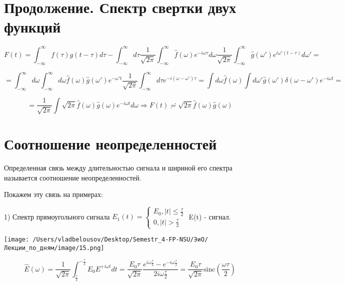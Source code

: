 \documentclass[12pt, a4paper]{report}
\begin{document}
\fi


\section{Продолжение. Спектр свертки двух функций}

\[ F(t)= \int_{-\infty}^{\infty} f(\tau)g(t- \tau)d \tau- \int_{-\infty}^{\infty} d \tau \frac{1}{\sqrt{2 \pi}} \int_{-\infty}^{\infty} \hat{f} (\omega) e ^{- i \omega \tau} d \omega \frac{1}{\sqrt{2\pi}} \int_{-\infty}^{\infty} \hat{g} (\omega') e^{i \omega' (t - \tau)} d \omega'     =\] 

\[ =\int_{-\infty}^{\infty}  d \omega \int_{-\infty}^{\infty} d \omega \hat{f} (\omega) \hat{g}(\omega ') e^{- \omega ' t } \frac{1}{\sqrt{2 \pi }} \int_{-\infty}^{\infty} d \tau e^{- i (\omega - \omega ' )\tau} = \int d \omega \hat{f} ( \omega) \int d \omega ' \hat{g} ( \omega ' ) \delta(\omega - \omega ') e ^{-i \omega t} =        \] 

\[ = \frac{1}{\sqrt{2 \pi}} \int  \sqrt{ 2 \pi} \hat{f}( \omega ) \hat{g} (\omega   )e ^{- i\omega t}   d \omega \Rightarrow F(t) \risingdotseq \sqrt{ 2 \pi } \hat{f}( \omega ) \hat{g } ( \omega)  \] 

\section{Соотношение неопределенностей}

\begin{definition}
    Определенная связь между длительностью сигнала и шириной его спектра называется соотношение неопределенностей.
\end{definition}

Покажем эту связь на примерах: 

1) Спектр прямоугольного сигнала \( E_1 (t) =\begin{cases}
E_0 , |t| \le  \frac{\tau}{2} \\
0 , |t| > \frac{\tau}{2}
\end{cases} \) E(t) - сигнал.

\begin{center}
    \texttt{[image: /Users/vladbelousov/Desktop/Semestr\_4-FP-NSU/ЭиО/Лекции\_по\_дням/image/15.png]}
\end{center}

\[ \hat{E}(\omega)= \frac{1}{\sqrt{2 \pi}} \int_{\frac{\tau}{2} }^{-\frac{\tau}{2} } E_0 E^{+ i \omega t} d t = \frac{E_0 \tau}{\sqrt{2 \pi}} \frac{e^{ i \omega \frac{\tau}{2} }- e^{ - i \omega \frac{\tau}{2} }}  {2 i \omega \frac{\tau}{2} }     = \frac{E_0 \tau}{\sqrt{2 \pi}} \mathrm{sinc} ( \frac{\omega \tau}{2} )   \] 
\end{document}
